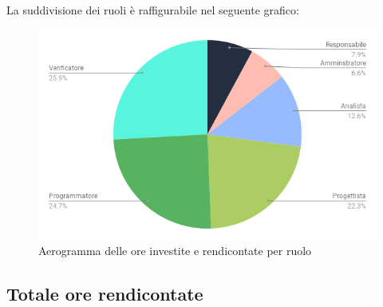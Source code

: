                 \pagebreak

            La suddivisione dei ruoli è raffigurabile nel seguente grafico:
                \begin{figure}[H]
                    \centering
                    \includegraphics[scale=0.6]{immagini/ore_totali_pie.png}
                    \caption{Aerogramma delle ore investite e rendicontate per ruolo}
                \end{figure}


    \subsection{Totale ore rendicontate}
